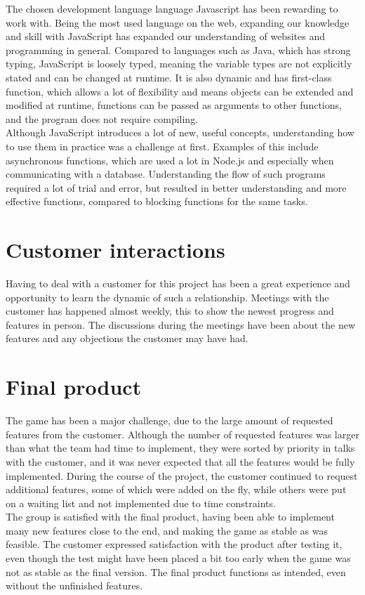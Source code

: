 The chosen development language language Javascript has been rewarding to work with. Being the most used language on the web, expanding our knowledge and skill with JavaScript has expanded our understanding of websites and programming in general. Compared to languages such as Java, which has strong typing, JavaScript is loosely typed, meaning the variable types are not explicitly stated and can be changed at runtime. It is also dynamic and has first-class function, which allows a lot of flexibility and means objects can be extended and modified at runtime, functions can be passed as arguments to other functions, and the program does not require compiling.\\
\newline
Although JavaScript introduces a lot of new, useful concepts, understanding how to use them in practice was a challenge at first. Examples of this include asynchronous functions, which are used a lot in Node.js and especially when communicating with a database. Understanding the flow of such programs required a lot of trial and error, but resulted in better understanding and more effective functions, compared to blocking functions for the same tasks.\\


\section{Customer interactions}

Having to deal with a customer for this project has been a great experience and opportunity to learn the dynamic of such a relationship. Meetings with the customer has happened almost weekly, this to show the newest progress and features in person. The discussions during the meetings have been about the new features and any objections the customer may have had. 


\section{Final product}

The game has been a major challenge, due to the large amount of requested features from the customer. Although the number of requested features was larger than what the team had time to implement, they were sorted by priority in talks with the customer, and it was never expected that all the features would be fully implemented. During the course of the project, the customer continued to request additional features, some of which were added on the fly, while others were put on a waiting list and not implemented due to time constraints.\\
\newline
The group is satisfied with the final product, having been able to implement many new features close to the end, and making the game as stable as was feasible. The customer expressed satisfaction with the product after testing it, even though the test might have been placed a bit too early when the game was not as stable as the final version. The final product functions as intended, even without the unfinished features.\\

